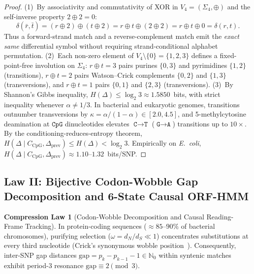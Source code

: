 \documentclass[10pt]{article}
\theoremstyle{definition}
\newtheorem{law}{Compression Law}
\begin{document}
\begin{proof}
(1)~By associativity and commutativity of XOR in $V_4 = (\Sigma_4, \oplus)$ and the self-inverse property $2 \oplus 2 = 0$:
\begin{equation}
  \delta(\bar{r}, \bar{t}) = (r \oplus 2) \oplus (t \oplus 2) = r \oplus t \oplus (2 \oplus 2) = r \oplus t \oplus 0 = \delta(r, t).
\end{equation}
Thus a forward-strand match and a reverse-complement match emit the \emph{exact same} differential symbol without requiring strand-conditional alphabet permutation.
(2)~Each non-zero element of $V_4 \setminus \{0\} = \{1,2,3\}$ defines a fixed-point-free involution on $\Sigma_4$: $r \oplus t = 3$ pairs purines $\{0,3\}$ and pyrimidines $\{1,2\}$ (transitions), $r \oplus t = 2$ pairs Watson--Crick complements $\{0,2\}$ and $\{1,3\}$ (transversions), and $r \oplus t = 1$ pairs $\{0,1\}$ and $\{2,3\}$ (transversions).
(3)~By Shannon's Gibbs inequality, $H(\Delta) \le \log_2 3 \approx 1.5850$~bits, with strict inequality whenever $\alpha \neq 1/3$. In bacterial and eukaryotic genomes, transitions outnumber transversions by $\kappa = \alpha/(1-\alpha) \in [2.0, 4.5]$, and 5-methylcytosine deamination at $\texttt{CpG}$ dinucleotides elevates $\texttt{C}\to\texttt{T}$ ($\texttt{G}\to\texttt{A}$) transitions up to $10\times$. By the conditioning-reduces-entropy theorem, $H(\Delta \mid C_{\text{CpG}}, \Delta_{\text{prev}}) \le H(\Delta) < \log_2 3$. Empirically on \textit{E.~coli}, $H(\Delta \mid C_{\text{CpG}}, \Delta_{\text{prev}}) \approx 1.10\text{--}1.32$~bits/SNP.
\end{proof}

\subsection{Law II: Bijective Codon-Wobble Gap Decomposition and 6-State Causal ORF-HMM}

\begin{law}[Codon-Wobble Decomposition and Causal Reading-Frame Tracking]
In protein-coding sequences ($\approx 85\text{--}90\%$ of bacterial chromosomes), purifying selection ($\omega = d_N/d_S \ll 1$) concentrates substitutions at every third nucleotide (Crick's synonymous wobble position~\cite{crick1966codon}). Consequently, inter-SNP gap distances $\text{gap} = p_k - p_{k-1} - 1 \in \mathbb{N}_0$ within syntenic matches exhibit period-3 resonance $\text{gap} \equiv 2 \pmod 3$.
\end{law}
\end{document}
